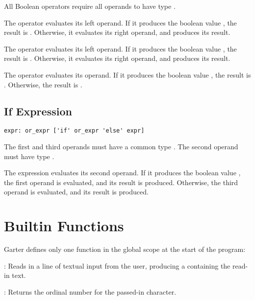 All Boolean operators require all operands to have type .

The  operator evaluates its left operand. If it produces the boolean
value , the result is . Otherwise, it evaluates its
right operand, and produces its result.

The  operator evaluates its left operand. If it produces the boolean
value , the result is . Otherwise, it evaluates its
right operand, and produces its result.

The  operator evaluates its operand. If it produces the boolean value
, the result is . Otherwise, the result is .

\subsection{If Expression}
\begin{lstlisting}
expr: or_expr ['if' or_expr 'else' expr]
\end{lstlisting}

The first and third operands must have a common type . The second operand
must have type .

The  expression evaluates its second operand. If it produces the
boolean value , the first operand is evaluated, and its result is
produced. Otherwise, the third operand is evaluated, and its result is produced.

\section{Builtin Functions}
\label{sec:functions}

Garter defines only one function in the global scope at the start of the program:

: Reads in a line of textual input from the user, producing
a  containing the read-in text.

: Returns the ordinal number for the passed-in character.

